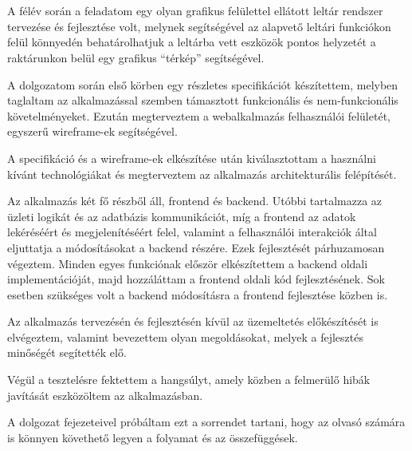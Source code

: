 \chapter{\bevezetes}
A félév során a feladatom egy olyan grafikus felülettel ellátott leltár rendszer tervezése és fejlesztése volt, melynek segítségével az alapvető leltári funkciókon felül könnyedén behatárolhatjuk a leltárba vett eszközök pontos helyzetét a raktárunkon belül egy grafikus “térkép” segítségével.

A dolgozatom során első körben egy részletes specifikációt készítettem, melyben taglaltam az alkalmazással szemben támasztott funkcionális és nem-funkcionális követelményeket.
Ezután megterveztem a webalkalmazás felhasználói felületét, egyszerű wireframe-ek segítségével.

A specifikáció és a wireframe-ek elkészítése után kiválasztottam a használni kívánt technológiákat és megterveztem az alkalmazás architekturális felépítését.

Az alkalmazás két fő részből áll, frontend és backend. Utóbbi tartalmazza az üzleti logikát és az adatbázis kommunikációt, míg a frontend az adatok lekéréséért és megjelenítéséért felel, valamint a felhasználói interakciók által eljuttatja a módosításokat a backend részére.
Ezek fejlesztését párhuzamosan végeztem. Minden egyes funkciónak először elkészítettem a backend oldali implementációját, majd hozzáláttam a frontend oldali kód fejlesztésének. Sok esetben szükséges volt a backend módosításra a frontend fejlesztése közben is.

Az alkalmazás tervezésén és fejlesztésén kívül az üzemeltetés előkészítését is elvégeztem, valamint bevezettem olyan megoldásokat, melyek a fejlesztés minőségét segítették elő.

Végül a tesztelésre fektettem a hangsúlyt, amely közben a felmerülő hibák javítását eszközöltem az alkalmazásban.

A dolgozat fejezeteivel próbáltam ezt a sorrendet tartani, hogy az olvasó számára is könnyen követhető legyen a folyamat és az összefüggések.